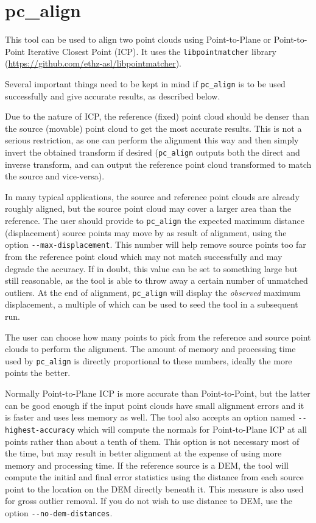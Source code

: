 \section{pc\_align}
\label{pcalign}

This tool can be used to align two point clouds using Point-to-Plane or
Point-to-Point Iterative Closest Point (ICP). It uses the
\texttt{libpointmatcher} library~\cite{Pomerleau12comp}
(\url{https://github.com/ethz-asl/libpointmatcher}).

Several important things need to be kept in mind if \texttt{pc\_align} is to be
used successfully and give accurate results, as described below.

Due to the nature of ICP, the reference (fixed) point cloud should be
denser than the source (movable) point cloud to get the most accurate
results. This is not a serious restriction, as one can perform the
alignment this way and then simply invert the obtained transform if
desired (\texttt{pc\_align} outputs both the direct and inverse
transform, and can output the reference point cloud transformed to match
the source and vice-versa).

In many typical applications, the source and reference point clouds are
already roughly aligned, but the source point cloud may cover a larger
area than the reference. The user should provide to \texttt{pc\_align}
the expected maximum distance (displacement) source points may move by
as result of alignment, using the option
\texttt{-\/-max-displacement}. This number will help remove source
points too far from the reference point cloud which may not match
successfully and may degrade the accuracy. If in doubt, this value can
be set to something large but still reasonable, as the tool is able to
throw away a certain number of unmatched outliers. At the end of
alignment, \texttt{pc\_align} will display the {\it observed} maximum
displacement, a multiple of which can be used to seed the tool in a
subsequent run.

The user can choose how many points to pick from the reference and
source point clouds to perform the alignment. The amount of memory and
processing time used by \texttt{pc\_align} is directly proportional to
these numbers, ideally the more points the better.

Normally Point-to-Plane ICP is more accurate than Point-to-Point, but
the latter can be good enough if the input point clouds have small
alignment errors and it is faster and uses less memory as well.  The
tool also accepts an option named \texttt{-\/-highest-accuracy} which
will compute the normals for Point-to-Plane ICP at all points rather
than about a tenth of them. This option is not necessary most of the
time, but may result in better alignment at the expense of using more
memory and processing time. If the reference source is a DEM, the
tool will compute the initial and final error statistics using the
distance from each source point to the location on the DEM directly
beneath it. This measure is also used for gross outlier removal.  If
you do not wish to use distance to DEM, use the option
\texttt{-\/-no-dem-distances}.

